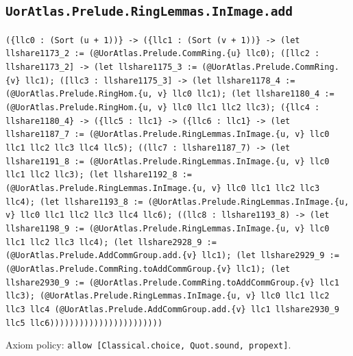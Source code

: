 \documentclass[11pt]{article}
\begin{document}
\subsection*{\texttt{UorAtlas.Prelude.RingLemmas.InImage.add}}
\noindent\texttt{(\{llc0 : (Sort (u + 1))\} -> (\{llc1 : (Sort (v + 1))\} -> (let llshare1173\_2 := (@UorAtlas.Prelude.CommRing.\{u\} llc0); ([llc2 : llshare1173\_2] -> (let llshare1175\_3 := (@UorAtlas.Prelude.CommRing.\{v\} llc1); ([llc3 : llshare1175\_3] -> (let llshare1178\_4 := (@UorAtlas.Prelude.RingHom.\{u, v\} llc0 llc1); (let llshare1180\_4 := (@UorAtlas.Prelude.RingHom.\{u, v\} llc0 llc1 llc2 llc3); (\{llc4 : llshare1180\_4\} -> (\{llc5 : llc1\} -> (\{llc6 : llc1\} -> (let llshare1187\_7 := (@UorAtlas.Prelude.RingLemmas.InImage.\{u, v\} llc0 llc1 llc2 llc3 llc4 llc5); ((llc7 : llshare1187\_7) -> (let llshare1191\_8 := (@UorAtlas.Prelude.RingLemmas.InImage.\{u, v\} llc0 llc1 llc2 llc3); (let llshare1192\_8 := (@UorAtlas.Prelude.RingLemmas.InImage.\{u, v\} llc0 llc1 llc2 llc3 llc4); (let llshare1193\_8 := (@UorAtlas.Prelude.RingLemmas.InImage.\{u, v\} llc0 llc1 llc2 llc3 llc4 llc6); ((llc8 : llshare1193\_8) -> (let llshare1198\_9 := (@UorAtlas.Prelude.RingLemmas.InImage.\{u, v\} llc0 llc1 llc2 llc3 llc4); (let llshare2928\_9 := (@UorAtlas.Prelude.AddCommGroup.add.\{v\} llc1); (let llshare2929\_9 := (@UorAtlas.Prelude.CommRing.toAddCommGroup.\{v\} llc1); (let llshare2930\_9 := (@UorAtlas.Prelude.CommRing.toAddCommGroup.\{v\} llc1 llc3); (@UorAtlas.Prelude.RingLemmas.InImage.\{u, v\} llc0 llc1 llc2 llc3 llc4 (@UorAtlas.Prelude.AddCommGroup.add.\{v\} llc1 llshare2930\_9 llc5 llc6)))))))))))))))))))))))}\par
\noindent Axiom policy: \texttt{allow [Classical.choice, Quot.sound, propext]}.\par
\end{document}
